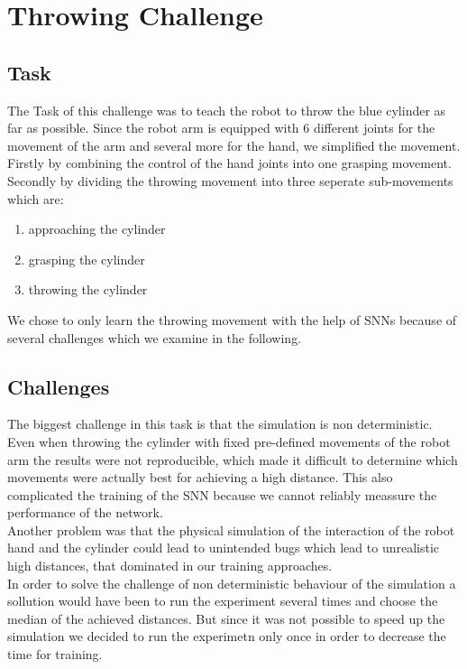 \section{Throwing Challenge}
\subsection{Task}
The Task of this challenge was to teach the robot to throw the blue cylinder as far as possible. Since the robot arm is equipped with 6 different joints for the movement of the arm and several more for the hand, we simplified the movement. Firstly by combining the control of the hand joints into one grasping movement. Secondly by dividing the throwing movement into three seperate sub-movements which are:
 \begin{enumerate}
\item approaching the cylinder
\item grasping the cylinder
\item throwing the cylinder
\end{enumerate}
We chose to only learn the throwing movement with the help of SNNs because of several challenges which we examine in the following.

\subsection{Challenges}
\label{challenges}
The biggest challenge in this task is that the simulation is non deterministic. Even when throwing the cylinder with fixed pre-defined movements of the robot arm the results were not reproducible, which made it difficult to determine which movements were actually best for achieving a high distance. This also complicated the training of the SNN because we cannot reliably meassure the performance of the network.\\
Another problem was that the physical simulation of the interaction of the robot hand and the cylinder could lead to unintended bugs which lead to unrealistic high distances, that dominated in our training approaches.\\
In order to solve the challenge of non deterministic behaviour of the simulation a sollution would have been to run the experiment several times and choose the median of the achieved distances. But since it was not possible to speed up the simulation we decided to run the experimetn only once in order to decrease the time for training.\\





